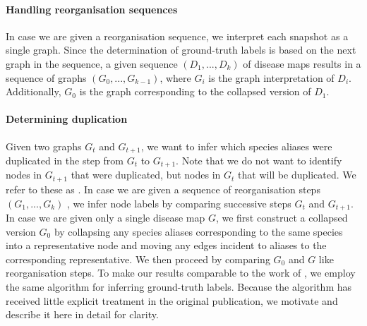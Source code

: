 \documentclass[
	fontsize=10pt, %
	twoside=false, %
	secnumdepth=1, %
  toc=indentunnumbered %
]{kaobook}
\begin{document}
\paragraph{Handling reorganisation sequences}
In case we are given a reorganisation sequence, we interpret each snapshot as a
single graph. Since the determination of ground-truth labels is based on the
next graph in the sequence, a given sequence $(D_1, ..., D_k)$ of disease maps
results in a sequence of graphs $(G_0, ..., G_{k-1})$, where $G_i$ is the graph
interpretation of $D_i$. Additionally, $G_0$ is the graph corresponding to the
collapsed version of $D_1$.


\paragraph{Determining duplication} Given two graphs $G_t$ and $G_{t+1}$, we
want to infer which species aliases were duplicated in the step from $G_t$ to
$G_{t+1}$. Note that we do not want to identify nodes in $G_{t+1}$ that were
duplicated, but nodes in $G_t$ that will be duplicated. We refer to these as
. In case we are given a sequence of reorganisation
steps $(G_1, ..., G_k)$ , we infer node labels by comparing successive steps
$G_t$ and $G_{t+1}$. In
case we are given only a single disease map $G$, we first construct a collapsed
version $G_0$ by collapsing any species aliases
corresponding to the same species into a representative node and moving any edges
incident to aliases to the corresponding representative. We then proceed by
comparing $G_0$ and $G$ like reorganisation steps.
%
To make our results comparable to the work of
\citeauthor{nielsen_MachineLearningSupport_2019}
\cite{nielsen_MachineLearningSupport_2019}, we employ the same algorithm for
inferring ground-truth labels. Because the algorithm has received little
explicit treatment in the original publication, we motivate and describe it here
in detail for clarity.
%
\end{document}
